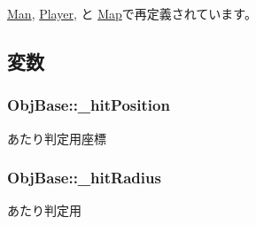 \hyperlink{class_man_aadef07ec563fbabf2afbd9ea15558c91}{Man}, \hyperlink{class_player_a05b60cac1922c5be5c1be16baffa4497}{Player}, と \hyperlink{class_map_a61efe2e1ec3f41d90bcbf826893404f1}{Map}で再定義されています。



\subsection{変数}
\hypertarget{class_obj_base_a6758eebc53b693f76fc11f0a8eb436be}{
\subsubsection[{\-\_\-hit\-Position}]{ Obj\-Base\-::\-\_\-hit\-Position\hspace{0.3cm}{\ttfamily [protected]}}}\label{class_obj_base_a6758eebc53b693f76fc11f0a8eb436be}


あたり判定用座標 

\hypertarget{class_obj_base_a0144260d49b5e7d12522c3f71bf2414c}{
\subsubsection[{\-\_\-hit\-Radius}]{ Obj\-Base\-::\-\_\-hit\-Radius\hspace{0.3cm}{\ttfamily [protected]}}}\label{class_obj_base_a0144260d49b5e7d12522c3f71bf2414c}


あたり判定用 

